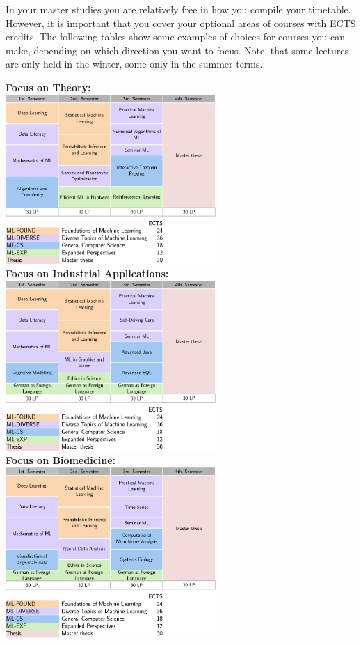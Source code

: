 
In your master studies you are relatively free in how you compile your timetable. However, it is important that you cover your optional areas of courses with ECTS credits. 
The following tables show some examples of choices for courses you can make, depending on which direction you want to focus. Note, that some lectures are only held in the winter,
some only in the summer terms.:

\begin{center}
\textbf{Focus on Theory:} \\
\includegraphics[width=0.6\textwidth]{media/ML_Theorie}\\
\textbf{Focus on Industrial Applications:} \\
\includegraphics[width=0.6\textwidth]{media/ML_Praktisch}\\
\newpage
\textbf{Focus on Biomedicine:} \\
\includegraphics[width=0.6\textwidth]{media/ML_Biomed}\\
\end{center}

